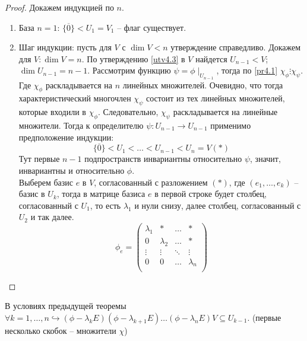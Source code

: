 \begin{proof}
    Докажем индукцией по $n$. \\
    \begin{enumerate}
        \item База $n = 1$: $\{ \overline{0} \} < U_1 = V_1$ -- флаг существует.
        \item
        Шаг индукции: пусть для $V$ с $\dim V < n$ утверждение справедливо. Докажем для $V: \dim V = n$. 
        По утверждению \ref{utv4.3} в $V$ найдется $U_{n - 1} < V$; $\dim U_{n - 1} = n - 1$. 
        Рассмотрим функцию $\psi = \phi \mid_{U_{n - 1}}$, тогда по \ref{pr4.1} 
        $\chi_{\phi} \vdots \chi_{\psi}$. Где $\chi_{\phi}$ раскладывается на $n$ линейных множителей. 
        Очевидно, что тогда характеристический многочлен $\chi_{\psi}$ состоит из тех линейных множителей, 
        которые входили в $\chi_{\phi}$. Следовательно, $\chi_{\psi}$ раскладывается на линейные множители. 
        Тогда к определителю $\psi: U_{n - 1} \to U_{n - 1}$ применимо предположение индукции:
        $$\{ \overline{0} \} < U_1 < \dots < U_{n - 1} < U_n = V  (*)$$
        Тут первые $n - 1$ подпространств инвариантны относительно $\psi$, значит, инвариантны и относительно $\phi$. \\
        Выберем базис $e$ в $V$, согласованный с разложением $(*)$, где $(e_1, \dots, e_k)$ -- базис в $U_k$, 
        тогда в матрице базиса $e$ в первой строке будет столбец, согласованный с $U_1$, то есть 
        $\lambda_1$ и нули снизу, далее столбец, согласованный с $U_2$ и так далее.
        \begin{equation*}
            \phi_e =
            \left(
                \begin{array}{cccc}
                    \lambda_1 & * & \dots & * \\
                    0 & \lambda_2 & \dots & * \\
                    \vdots & \vdots & \ddots & \vdots \\
                    0 & 0 & \dots & \lambda_n \\
                \end{array}
                \right)
            \end{equation*}
    \end{enumerate}
\end{proof}

\begin{corollary}
    \label{col2}
    В условиях предыдущей теоремы $\forall k = 1, \dots, n \hookrightarrow (\phi - \lambda_k E)(\phi - \lambda_{k + 1} E) \dots (\phi - \lambda_n E) V \subseteq U_{k - 1}$. (первые несколько скобок -- множители $\chi$)
\end{corollary}

